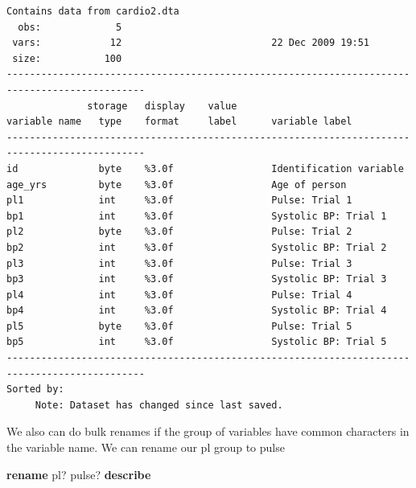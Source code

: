 \documentclass[
]{book}
\newenvironment{Shaded}{\begin{snugshade}}{\end{snugshade}}
\newcommand{\KeywordTok}[1]{\textcolor[rgb]{0.13,0.29,0.53}{\textbf{#1}}}
\newcommand{\NormalTok}[1]{#1}
\begin{document}
\begin{verbatim}
Contains data from cardio2.dta
  obs:             5                          
 vars:            12                          22 Dec 2009 19:51
 size:           100                          
----------------------------------------------------------------------------------------------
              storage   display    value
variable name   type    format     label      variable label
----------------------------------------------------------------------------------------------
id              byte    %3.0f                 Identification variable
age_yrs         byte    %3.0f                 Age of person
pl1             int     %3.0f                 Pulse: Trial 1
bp1             int     %3.0f                 Systolic BP: Trial 1
pl2             byte    %3.0f                 Pulse: Trial 2
bp2             int     %3.0f                 Systolic BP: Trial 2
pl3             int     %3.0f                 Pulse: Trial 3
bp3             int     %3.0f                 Systolic BP: Trial 3
pl4             int     %3.0f                 Pulse: Trial 4
bp4             int     %3.0f                 Systolic BP: Trial 4
pl5             byte    %3.0f                 Pulse: Trial 5
bp5             int     %3.0f                 Systolic BP: Trial 5
----------------------------------------------------------------------------------------------
Sorted by: 
     Note: Dataset has changed since last saved.
\end{verbatim}

We also can do bulk renames if the group of variables have common
characters in the variable name. We can rename our pl group to pulse

\begin{Shaded}
\begin{Highlighting}[]
\KeywordTok{rename}\NormalTok{ pl? pulse? }
\KeywordTok{describe}
\end{Highlighting}
\end{Shaded}
\end{document}
